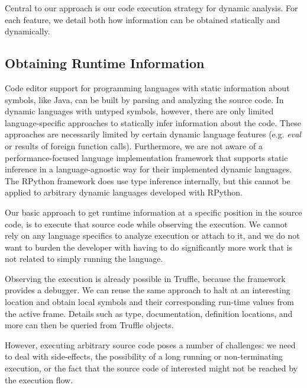 \documentclass[sigplan,10pt,screen]{acmart}
\begin{document}
Central to our approach is our code execution strategy for dynamic analysis. For
each feature, we detail both how information can be obtained statically and
dynamically.

\subsection{Obtaining Runtime Information}
\label{sec:newApproachCompletionLocalsUsingRuntimeInfo}
Code editor support for programming languages with static information about
symbols, like Java, can be built by parsing and analyzing the source code. In
dynamic languages with untyped symbols, however, there are only limited
language-specific approaches to statically infer information about the
code. These approaches are necessarily limited by certain dynamic language
features (e.g. \emph{eval} or results of foreign function calls). Furthermore,
we are not aware of a performance-focused language implementation framework that
supports static inference in a language-agnostic way for their implemented
dynamic languages. The RPython framework does use type inference internally, but
this cannot be applied to arbitrary dynamic languages developed with RPython.

Our basic approach to get runtime information at a specific position in the
source code, is to execute that source code while observing the execution. We
cannot rely on any language specifics to analyze execution or attach to it, and
we do not want to burden the developer with having to do significantly more work
that is not related to simply running the language.

Observing the execution is already possible in Truffle, because the framework
provides a debugger. We can reuse the same approach to halt at an interesting
location and obtain local symbols and their corresponding run-time values from
the active frame. Details such as type, documentation, definition locations, and
more can then be queried from Truffle objects.

However, executing arbitrary source code poses a number of challenges: we need
to deal with side-effects, the possibility of a long running or non-terminating
execution, or the fact that the source code of interested might not be reached
by the execution flow.

\addtocounter{footnote}{-3}
\addtocounter{footnote}{1}
\addtocounter{footnote}{1}
\end{document}
